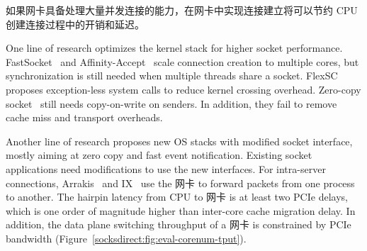 如果网卡具备处理大量并发连接的能力，在网卡中实现连接建立将可以节约 CPU 创建连接过程中的开销和延迟。





\iffalse
{}
One line of research optimizes the kernel stack for higher socket performance. FastSocket~\cite{lin2016scalable} and Affinity-Accept~\cite{pesterev2012improving} scale connection creation to multiple cores, but synchronization is still needed when multiple threads share a socket.
FlexSC~\cite{soares2010flexsc} proposes exception-less system calls to reduce kernel crossing overhead.
Zero-copy socket~\cite{thadani1995efficient,chu1996zero} still needs copy-on-write on senders.
In addition, they fail to remove cache miss and transport overheads.


Another line of research proposes new OS stacks with modified socket interface, mostly aiming at zero copy and fast event notification. Existing socket applications need modifications to use the new interfaces.
For intra-server connections, Arrakis~\cite{peter2016arrakis} and IX~\cite{belay2017ix} use the 网卡 to forward packets from one process to another. The hairpin latency from CPU to 网卡 is at least two PCIe delays, which is one order of magnitude higher than inter-core cache migration delay. In addition, the data plane switching throughput of a 网卡 is constrained by PCIe bandwidth (Figure~\ref{socksdirect:fig:eval-corenum-tput}).

